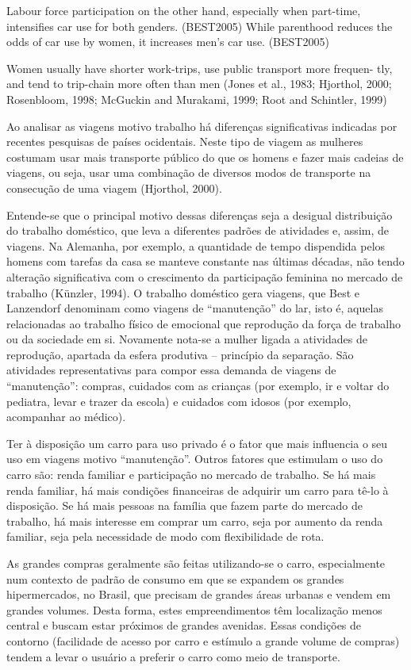 Labour force participation on the other hand, especially when part-time, intensifies car use for both genders. (BEST2005)
While parenthood reduces the odds of car use by women, it increases men’s car use. (BEST2005)

Women usually have shorter work-trips, use public transport more frequen- tly, and tend to trip-chain more often than men (Jones et al., 1983; Hjorthol, 2000; Rosenbloom, 1998; McGuckin and Murakami, 1999; Root and Schintler, 1999)


Ao analisar as viagens motivo trabalho há diferenças significativas indicadas por recentes pesquisas de países ocidentais. Neste tipo de viagem as mulheres costumam usar mais transporte público do que os homens e fazer mais cadeias de viagens, ou seja, usar uma combinação de diversos modos de transporte na consecução de uma viagem (Hjorthol, 2000).

Entende-se que o principal motivo dessas diferenças seja a desigual distribuição do trabalho doméstico, que leva a diferentes padrões de atividades e, assim, de viagens. Na Alemanha, por exemplo, a quantidade de tempo dispendida pelos homens com tarefas da casa se manteve constante nas últimas décadas, não tendo alteração significativa com o crescimento da participação feminina no mercado de trabalho (Künzler, 1994). O trabalho doméstico gera viagens, que Best e Lanzendorf denominam como viagens de “manutenção” do lar, isto é, aquelas relacionadas ao trabalho físico de emocional que reprodução da força de trabalho ou da sociedade em si. Novamente nota-se a mulher ligada a atividades de reprodução, apartada da esfera produtiva – princípio da separação. São atividades representativas para compor essa demanda de viagens de “manutenção”: compras, cuidados com as crianças (por exemplo, ir e voltar do pediatra, levar e trazer da escola) e cuidados com idosos (por exemplo, acompanhar ao médico).

Ter à disposição um carro para uso privado é o fator que mais influencia o seu uso em viagens motivo “manutenção”. Outros fatores que estimulam o uso do carro são: renda familiar e participação no mercado de trabalho. Se há mais renda familiar, há mais condições financeiras de adquirir um carro para tê-lo à disposição. Se há mais pessoas na família que fazem parte do mercado de trabalho, há mais interesse em comprar um carro, seja por aumento da renda familiar, seja pela necessidade de modo com flexibilidade de rota.

As grandes compras geralmente são feitas utilizando-se o carro, especialmente num contexto de padrão de consumo em que se expandem os grandes hipermercados, no Brasil, que precisam de grandes áreas urbanas e vendem em grandes volumes. Desta forma, estes empreendimentos têm localização menos central e buscam estar próximos de grandes avenidas. Essas condições de contorno (facilidade de acesso por carro e estímulo a grande volume de compras) tendem a levar o usuário a preferir o carro como meio de transporte.

